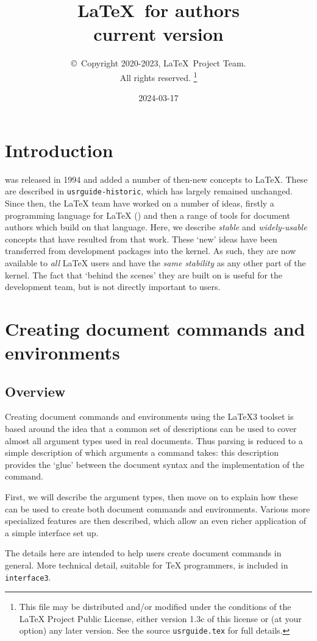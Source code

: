 \documentclass{ltxguide}
\title{\LaTeX\ for authors\\ current version}
\author{\copyright~Copyright 2020-2023, \LaTeX\ Project Team.\\
   All rights reserved.%
   \footnote{This file may be distributed and/or modified under the
     conditions of the \LaTeX{} Project Public License, either version 1.3c
     of this license or (at your option) any later version. See the source
    \texttt{usrguide.tex} for full details.}%
}
\date{2024-03-17}
\begin{document}
\maketitle

\tableofcontents

\section{Introduction}

\LaTeXe{} was released in 1994 and added a number of then-new concepts to
\LaTeX{}. These are described in \texttt{usrguide-historic}, which has largely remained
unchanged. Since then, the \LaTeX{} team have worked on a number of ideas,
firstly a programming language for \LaTeX{} () and then a range of
tools for document authors which build on that language. Here, we describe
\emph{stable} and \emph{widely-usable} concepts that have resulted from that
work. These `new' ideas have been transferred from development packages
into the \LaTeXe{} kernel. As such, they are now available to \emph{all}
\LaTeX{} users and have the \emph{same stability} as any other part of the
kernel. The fact that `behind the scenes' they are built on 
is useful for the development team, but is not directly important to users.

\section{Creating document commands and environments}

\subsection{Overview}

Creating document commands and environments using the \LaTeX3 toolset is based
around the idea that a common set of descriptions can be used to cover almost
all argument types used in real documents. Thus parsing is reduced to a simple
description of which arguments a command takes: this description provides the
`glue' between the document syntax and the implementation of the
command.

First, we will describe the argument types, then move on to explain how these
can be used to create both document commands and environments. Various more
specialized features are then described, which allow an even richer application
of a simple interface set up.

The details here are intended to help users create document commands in
general. More technical detail, suitable for \TeX{} programmers, is included
in \texttt{interface3}.
\end{document}
